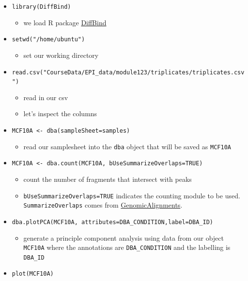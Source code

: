 \documentclass[
]{book}
\providecommand{\tightlist}{%
  \setlength{\itemsep}{0pt}\setlength{\parskip}{0pt}}
\begin{document}
\begin{itemize}
\tightlist
\item
  \texttt{library(DiffBind)}

  \begin{itemize}
  \tightlist
  \item
    we load R package \href{https://bioconductor.org/packages/release/bioc/html/DiffBind.html}{DiffBind}
  \end{itemize}
\item
  \texttt{setwd("/home/ubuntu")}

  \begin{itemize}
  \tightlist
  \item
    set our working directory
  \end{itemize}
\item
  \texttt{read.csv("CourseData/EPI\_data/module123/triplicates/triplicates.csv")}

  \begin{itemize}
  \tightlist
  \item
    read in our csv
  \item
    let's inspect the columns
  \end{itemize}
\item
  \texttt{MCF10A\ \textless{}-\ dba(sampleSheet=samples)}

  \begin{itemize}
  \tightlist
  \item
    read our samplesheet into the \texttt{dba} object that will be saved as \texttt{MCF10A}
  \end{itemize}
\item
  \texttt{MCF10A\ \textless{}-\ dba.count(MCF10A,\ bUseSummarizeOverlaps=TRUE)}

  \begin{itemize}
  \tightlist
  \item
    count the number of fragments that intersect with peaks
  \item
    \texttt{bUseSummarizeOverlaps=TRUE} indicates the counting module to be used. \texttt{SummarizeOverlaps} comes from \href{https://www.rdocumentation.org/packages/GenomicAlignments/versions/1.8.4/topics/summarizeOverlaps-methods}{GenomicAlignments}.
  \end{itemize}
\item
  \texttt{dba.plotPCA(MCF10A,\ attributes=DBA\_CONDITION,label=DBA\_ID)}

  \begin{itemize}
  \tightlist
  \item
    generate a principle component analysis using data from our object \texttt{MCF10A} where the annotations are \texttt{DBA\_CONDITION} and the labelling is \texttt{DBA\_ID}
  \end{itemize}
\item
  \texttt{plot(MCF10A)}


\end{itemize}
\end{document}
